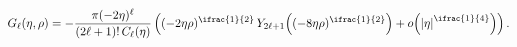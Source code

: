 \[\mathop{G_{\ell}\/}\nolimits\!\left(\eta,\rho\right)=-\dfrac{\pi(-2\eta)^{\ell%
}}{(2\ell+1)!\mathop{C_{\ell}\/}\nolimits\!\left(\eta\right)}\left((-2\eta\rho%
)^{\ifrac{1}{2}}\*\mathop{Y_{2\ell+1}\/}\nolimits\!\left((-8\eta\rho)^{\ifrac{%
1}{2}}\right)+\mathop{o\/}\nolimits\!\left(\left|\eta\right|^{\ifrac{1}{4}}%
\right)\right).\]